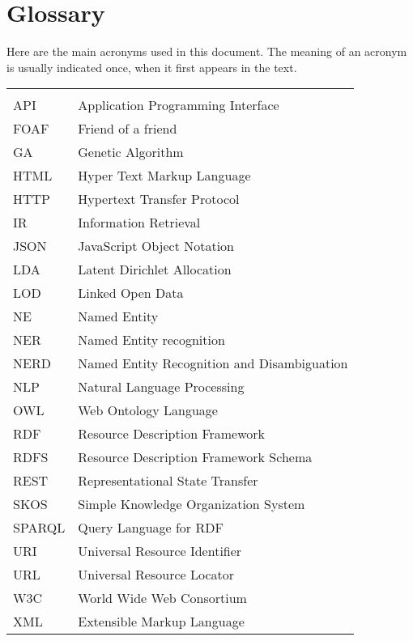 \chapter*{Glossary}

Here are the main acronyms used in this document. The meaning of an acronym is usually indicated once, when it first appears in the text.

\begin{longtable}{lp{9cm}}
 &\\
 API  &   Application Programming Interface \\
 FOAF & Friend of a friend \\
 GA & Genetic Algorithm \\
 HTML &   Hyper Text Markup Language\\
 HTTP & Hypertext Transfer Protocol \\
 IR & Information Retrieval \\
 JSON & JavaScript Object Notation \\
 LDA & Latent Dirichlet Allocation \\
 LOD & Linked Open Data \\
 NE & Named Entity \\
 NER & Named Entity recognition\\
 NERD & Named Entity Recognition and Disambiguation \\
 NLP & Natural Language Processing \\
 OWL &  Web Ontology Language \\
 RDF  & Resource Description Framework\\
 RDFS & Resource Description Framework Schema \\
 REST & Representational State Transfer\\
 SKOS &  Simple Knowledge Organization System \\
 SPARQL & Query Language for RDF \\
 URI & Universal Resource Identifier \\
 URL & Universal Resource Locator \\
 W3C & World Wide Web Consortium \\
 XML & Extensible Markup Language
\end{longtable}

